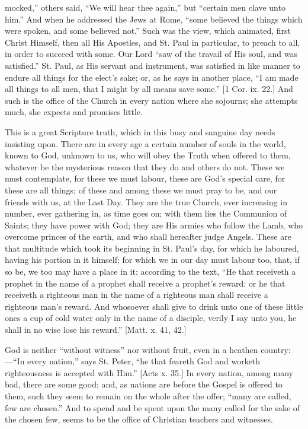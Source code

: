 mocked,'' others said, ``We will hear thee again,'' but
``certain men clave unto him.'' And when he addressed the Jews
at Rome, ``some believed the things which were spoken, and some
believed not.'' Such was the view, which animated, first Christ
Himself, then all His Apostles, and St. Paul in particular, to preach
to all, in order to succeed with some. Our Lord ``saw of the
travail of His soul, and was satisfied.'' St. Paul, as His servant
and instrument, was satisfied in like manner to endure all things for
the elect's sake; or, as he says in another place, ``I am made all
things to all men, that I might by all means save some.'' [1 Cor.
ix. 22.] And such is the office of the Church in every nation where
she sojourns; she attempts much, she expects and promises little.

This is a great Scripture truth, which in this busy and sanguine
day needs insisting upon. There are in every age a certain number of
souls in the world, known to God, unknown to us, who will obey the
Truth when offered to them, whatever be the mysterious reason that
they do and others do not. These we must contemplate, for these we
must labour, these are God's special care, for these are all things;
of these and among these we must pray to be, and our friends with us,
at the Last Day. They are the true Church, ever increasing in number,
ever gathering in, as time goes on; with them lies the Communion of
Saints; they have power with God; they are His armies who follow the
Lamb, who overcome princes of the earth, and who shall hereafter judge
Angels. These are that multitude which took its beginning in St. Paul's
day, for which he laboured, having his portion in it himself; for
which we in our day must labour too, that, if so be, we too may have a
place in it: according to the text, ``He that receiveth a prophet
in the name of a prophet shall receive a prophet's reward; or he that
receiveth a righteous man in the name of a righteous man shall receive
a righteous man's reward. And whosoever shall give to drink unto one
of these little ones a cup of cold water only in the name of a
disciple, verily I say unto you, he shall in no wise lose his
reward.'' [Matt. x. 41, 42.]

God is neither ``without witness'' nor without fruit, even
in a heathen country:—``In every nation,'' says St. Peter,
``he that feareth God and worketh righteousness is accepted with
Him.'' [Acts x. 35.] In every nation, among many bad, there are
some good; and, as nations are before the Gospel is offered to them,
such they seem to remain on the whole after the offer; ``many are
called, few are chosen.'' And to spend and be spent upon the many
called for the sake of the chosen few, seems to be the office of
Christian teachers and witnesses.

